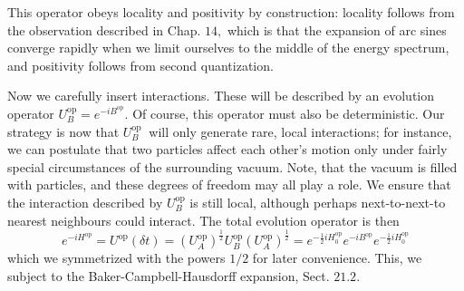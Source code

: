 \documentclass[main.tex]{subfiles}
\begin{document}
This operator obeys locality and positivity by construction: locality follows from the observation described in Chap. $14,$ which is that the expansion of arc sines converge rapidly when we limit ourselves to the middle of the energy spectrum, and positivity follows from second quantization.

Now we carefully insert interactions. These will be described by an evolution operator $U_{B}^{\mathrm{op}}=e^{-i B^{\mathrm{op}}} .$ Of course, this operator must also be deterministic. Our strategy is now that $U_{B}^{\text {op }}$ will only generate rare, local interactions; for instance, we can postulate that two particles affect each other's motion only under fairly special circumstances of the surrounding vacuum. Note, that the vacuum is filled with particles, and these degrees of freedom may all play a role. We ensure that the interaction described by $U_{B}^{\mathrm{op}}$ is still local, although perhaps next-to-next-to nearest neighbours could interact. The total evolution operator is then
$$
e^{-i H^{\mathrm{op}}}=U^{\mathrm{op}}(\delta t)=\left(U_{A}^{\mathrm{op}}\right)^{\frac{1}{2}} U_{B}^{\mathrm{op}}\left(U_{A}^{\mathrm{op}}\right)^{\frac{1}{2}}=e^{-\frac{1}{2} i H_{0}^{\mathrm{op}}} e^{-i B^{\mathrm{op}}} e^{-\frac{1}{2} i H_{0}^{\mathrm{op}}}
$$
which we symmetrized with the powers $1 / 2$ for later convenience. This, we subject to the Baker-Campbell-Hausdorff expansion, Sect. $21.2 .$
\end{document}
